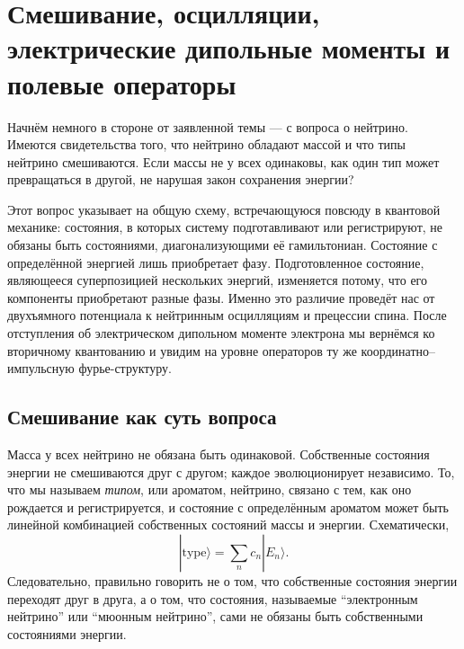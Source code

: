 \chapter{Смешивание, осцилляции, электрические дипольные моменты и полевые операторы}

Начнём немного в стороне от заявленной темы — с вопроса о нейтрино. Имеются свидетельства того, что нейтрино обладают массой и что типы нейтрино смешиваются. Если массы не у всех одинаковы, как один тип может превращаться в другой, не нарушая закон сохранения энергии?

Этот вопрос указывает на общую схему, встречающуюся повсюду в квантовой механике: состояния, в которых систему подготавливают или регистрируют, не обязаны быть состояниями, диагонализующими её гамильтониан. Состояние с определённой энергией лишь приобретает фазу. Подготовленное состояние, являющееся суперпозицией нескольких энергий, изменяется потому, что его компоненты приобретают разные фазы. Именно это различие проведёт нас от двухъямного потенциала к нейтринным осцилляциям и прецессии спина. После отступления об электрическом дипольном моменте электрона мы вернёмся ко вторичному квантованию и увидим на уровне операторов ту же координатно--импульсную фурье-структуру.

\section{Смешивание как суть вопроса}

Масса у всех нейтрино не обязана быть одинаковой. Собственные состояния энергии не смешиваются друг с другом; каждое эволюционирует независимо. То, что мы называем \emph{типом}, или ароматом, нейтрино, связано с тем, как оно рождается и регистрируется, и состояние с определённым ароматом может быть линейной комбинацией собственных состояний массы и энергии. Схематически,
\begin{equation}
|\text{type}\rangle = \sum_n c_n |E_n\rangle .
\end{equation}
Следовательно, правильно говорить не о том, что собственные состояния энергии переходят друг в друга, а о том, что состояния, называемые ``электронным нейтрино'' или ``мюонным нейтрино'', сами не обязаны быть собственными состояниями энергии.

\begin{classroomqa}
\end{classroomqa}

